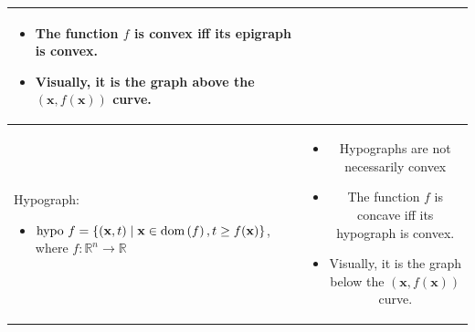 \documentclass{article}
\newcommand{\dom}[1]{\ensuremath{\textnormal{dom}\left(#1\right)}} %
\begin{document}
\begin{xltabular}{\textwidth}{|A|C|}
\begin{itemize}[leftmargin=*]
    \item The function \(f\) is convex iff its epigraph is convex.
    \item Visually, it is the graph above the \((\mathbf{x}, f(\mathbf{x}))\) curve.
\end{itemize}\\
\hline
Hypograph:
\begin{itemize}[leftmargin=*]
    \item \(\textnormal{hypo } f = \{(\mathbf{x}, t)\mid \mathbf{x} \in \dom{f}, t\geq f(\mathbf{x})\}\), where \(f: \mathbb{R}^{n} \rightarrow \mathbb{R}\)
\end{itemize} & \vspace{-3.5ex}
\begin{itemize}[leftmargin=*]
    \item Hypographs are not necessarily convex
    \item The function \(f\) is concave iff its hypograph is convex.
    \item Visually, it is the graph below the \((\mathbf{x}, f(\mathbf{x}))\) curve.
\end{itemize}\\
\hline
\end{xltabular}
\end{document}

